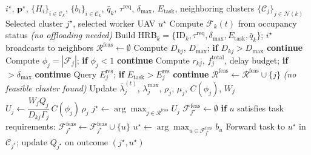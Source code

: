 \documentclass[journal]{IEEEtran}
\begin{document}
\begin{IEEEproof}
\begin{IEEEproof}
\end{IEEEproof}
\begin{algorithm}[t]
\caption{Post-Election Cooperative Task Offloading}
\label{alg:offloading}
\begin{algorithmic}[1]
\Require $i^{\star}$, $\mathbf{p}^{\star}$, $\{H_i\}_{i\in\mathcal{C}_k}$, $\{b_i\}_{i\in\mathcal{C}_k}$, $\bar{q}_k$, $\tau^{\mathrm{req}}$, $\delta_{\max}$, $E_{\mathrm{task}}$, neighboring clusters $\{\mathcal{C}_j\}_{j\in\mathcal{N}(k)}$
\Ensure Selected cluster $j^{\star}$, selected worker UAV $u^{\star}$
\State Compute $\mathcal{F}_k(t)$ from occupancy status
 \Return \emph{(no offloading needed)} \EndIf
\State Build HRB$_k=\{\mathrm{ID}_k,\tau^{\mathrm{req}},\delta_{\max},E_{\mathrm{task}},\bar{q}_k\}$; $i^{\star}$ broadcasts to neighbors
\State $\mathcal{R}^{\mathrm{feas}} \gets \emptyset$
    \State Compute $D_{kj}$, $D_{\max}$; \textbf{if} $D_{kj}>D_{\max}$ \textbf{continue} 
    \State Compute $\phi_j=|\mathcal{F}_j|$; \textbf{if} $\phi_j<1$ \textbf{continue} 
    \State Compute $r_{kj}$, $f_j^{\mathrm{total}}$, delay budget; \textbf{if} $>\delta_{\max}$ \textbf{continue} 
    \State Query $E_j^{\mathrm{res}}$; \textbf{if} $E_{\mathrm{task}}>E_j^{\mathrm{res}}$ \textbf{continue} 
    \State $\mathcal{R}^{\mathrm{feas}} \gets \mathcal{R}^{\mathrm{feas}} \cup \{j\}$ 
\EndFor
{} \Return \emph{(no feasible cluster found)} \EndIf
{}
    \State Update $\bar{\lambda}_j^{(t)}$, $\lambda_j^{\max}$, $\rho_j$, $\mu_j$, $C(\phi_j)$, $W_j$
    \State $U_j \gets \dfrac{W_jQ_j}{D_{kj}\Gamma_j}\,C(\phi_j)\,\rho_j$
\EndFor
\State $j^{\star} \gets \arg\max_{j\in\mathcal{R}^{\mathrm{feas}}} U_j$ 
\State $\mathcal{F}_{j^{\star}}^{\mathrm{feas}} \gets \emptyset$
    \State \textbf{if} $u$ satisfies task requirements: $\mathcal{F}_{j^{\star}}^{\mathrm{feas}} \gets \mathcal{F}_{j^{\star}}^{\mathrm{feas}} \cup \{u\}$
\EndFor
\State $u^{\star} \gets \arg\max_{u\in\mathcal{F}_{j^{\star}}^{\mathrm{feas}}} b_u$ 
\State Forward task to $u^{\star}$ in $\mathcal{C}_{j^{\star}}$; update $Q_{j^{\star}}$ on outcome 
\State \Return $(j^{\star},u^{\star})$
\end{algorithmic}
\end{algorithm}



\end{IEEEproof}
\end{document}
